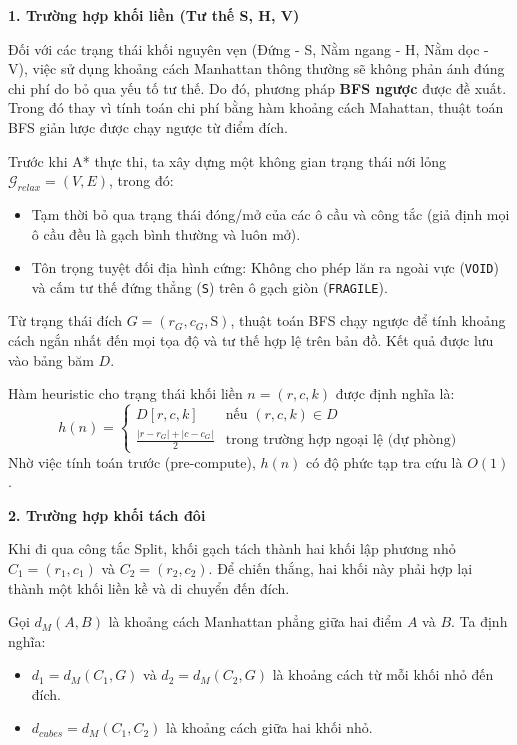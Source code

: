\documentclass[12pt,a4paper]{article}
\begin{document}
\textbf{1. Trường hợp khối liền (Tư thế S, H, V)}

Đối với các trạng thái khối nguyên vẹn (Đứng - S, Nằm ngang - H, Nằm dọc - V), việc sử dụng khoảng cách Manhattan thông thường sẽ không phản ánh đúng chi phí do bỏ qua yếu tố tư thế. Do đó, phương pháp \textbf{BFS ngược} được đề xuất. Trong đó thay vì tính toán chi phí bằng hàm khoảng cách Mahattan, thuật toán BFS giản lược được chạy ngược từ điểm đích.

Trước khi A* thực thi, ta xây dựng một không gian trạng thái nới lỏng $\mathcal{G}_{relax} = (V, E)$, trong đó:
\begin{itemize}
    \item Tạm thời bỏ qua trạng thái đóng/mở của các ô cầu và công tắc (giả định mọi ô cầu đều là gạch bình thường và luôn mở).
    \item Tôn trọng tuyệt đối địa hình cứng: Không cho phép lăn ra ngoài vực (\texttt{VOID}) và cấm tư thế đứng thẳng (\texttt{S}) trên ô gạch giòn (\texttt{FRAGILE}).
\end{itemize}

Từ trạng thái đích $G = (r_G, c_G, \text{S})$, thuật toán BFS chạy ngược để tính khoảng cách ngắn nhất đến mọi tọa độ và tư thế hợp lệ trên bản đồ. Kết quả được lưu vào bảng băm $D$.

Hàm heuristic cho trạng thái khối liền $n = (r, c, k)$ được định nghĩa là:
\begin{equation}
    h(n) =
    \begin{cases}
    D[r, c, k] & \text{nếu } (r, c, k) \in D \\
    \frac{|r - r_G| + |c - c_G|}{2} & \text{trong trường hợp ngoại lệ (dự phòng)}
    \end{cases}
\end{equation}
Nhờ việc tính toán trước (pre-compute), $h(n)$ có độ phức tạp tra cứu là $O(1)$.

\textbf{2. Trường hợp khối tách đôi}

Khi đi qua công tắc Split, khối gạch tách thành hai khối lập phương nhỏ $C_1 = (r_1, c_1)$ và $C_2 = (r_2, c_2)$. Để chiến thắng, hai khối này phải hợp lại thành một khối liền kề và di chuyển đến đích.

Gọi $d_M(A, B)$ là khoảng cách Manhattan phẳng giữa hai điểm $A$ và $B$. Ta định nghĩa:
\begin{itemize}
    \item $d_1 = d_M(C_1, G)$ và $d_2 = d_M(C_2, G)$ là khoảng cách từ mỗi khối nhỏ đến đích.
    \item $d_{cubes} = d_M(C_1, C_2)$ là khoảng cách giữa hai khối nhỏ.
\end{itemize}
\end{document}
